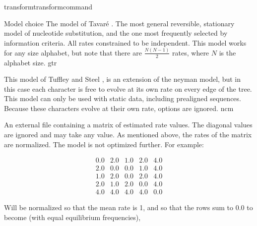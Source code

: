 \begin{command}{transform}{transformcommand}
\begin{arguments}
\begin {argumentgroup} {Model choice}
                {The model of Tavar\'{e} \cite{tavare1986}. The most general
                reversible, stationary model of nucleotide substitution,
                and the one most frequently selected by information
                criteria. All rates constrained to be independent. This
                model works for any size alphabet, but note that there
                are $\frac{N (N-1)}{2}$ rates, where $N$ is the alphabet
                size.}
                {gtr}
    
                {This model of Tuffley and Steel \cite{tuffleyandsteel1998}, is an 
                extension of the neyman model, but in this case each character is 
                free to evolve at its own rate on every edge of the tree. This 
                model can only be used with static data, including prealigned sequences.  
                Because these characters evolve at their own rate,  
                options are ignored.}
                {ncm}
                    
                {An external file containing a matrix of estimated rate
                values. The diagonal values are ignored and may take any
                value. As mentioned above, the rates of the matrix are
                normalized. The model is not optimized further. For example:

                \begin{equation*}
                    \begin{array}{ccccc}
                        0.0 & 2.0 & 1.0 & 2.0 & 4.0 \\
                        2.0 & 0.0 & 0.0 & 1.0 & 4.0 \\
                        1.0 & 2.0 & 0.0 & 2.0 & 4.0 \\
                        2.0 & 1.0 & 2.0 & 0.0 & 4.0 \\
                        4.0 & 4.0 & 4.0 & 4.0 & 0.0
                     \end{array}
                \end{equation*} 

                Will be normalized so that the mean rate is 1, and so
                that the rows sum to 0.0 to become (with equal equilibrium
                frequencies),

}
\end{argumentgroup}
\end{arguments}
\end{command}
